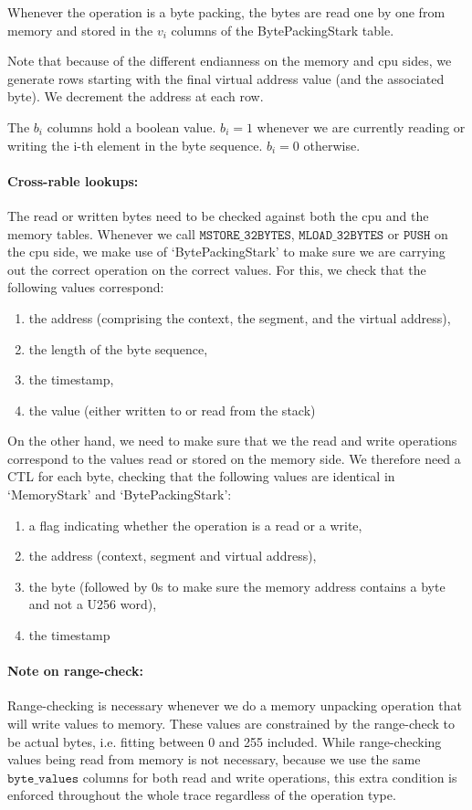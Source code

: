 Whenever the operation is a byte packing, the bytes are read one by one from memory and stored in the $v_i$ columns of the BytePackingStark table.

Note that because of the different endianness on the memory and cpu sides, we generate rows starting with the final virtual address value (and the associated byte). We decrement the address at each row.

The $b_i$ columns hold a boolean value. $b_i = 1$ whenever we are currently reading or writing the i-th element in the byte sequence. $b_i = 0$ otherwise.

\paragraph{Cross-rable lookups:}
The read or written bytes need to be checked against both the cpu and the memory tables. Whenever we call $\texttt{MSTORE\_32BYTES}$, $\texttt{MLOAD\_32BYTES}$ or $\texttt{PUSH}$ on the cpu side, we make use of `BytePackingStark' to make sure we are carrying out the correct operation on the correct values. For this, we check that the following values correspond:
\begin{enumerate}
    \item the address (comprising the context, the segment, and the virtual address),
    \item the length of the byte sequence,
    \item the timestamp,
    \item the value (either written to or read from the stack)
\end{enumerate}

On the other hand, we need to make sure that we the read and write operations correspond to the values read or stored on the memory side. We therefore need a CTL for each byte, checking that the following values are identical in `MemoryStark' and `BytePackingStark':
\begin{enumerate}
    \item a flag indicating whether the operation is a read or a write,
    \item the address (context, segment and virtual address),
    \item the byte (followed by 0s to make sure the memory address contains a byte and not a U256 word),
    \item the timestamp
\end{enumerate}

\paragraph*{Note on range-check:} Range-checking is necessary whenever we do a memory unpacking operation that will
write values to memory. These values are constrained by the range-check to be actual bytes, i.e. fitting between 0 and 255 included.
While range-checking values being read from memory is not necessary, because we use the same $\texttt{byte\_values}$ columns for both read
and write operations, this extra condition is enforced throughout the whole trace regardless of the operation type.

